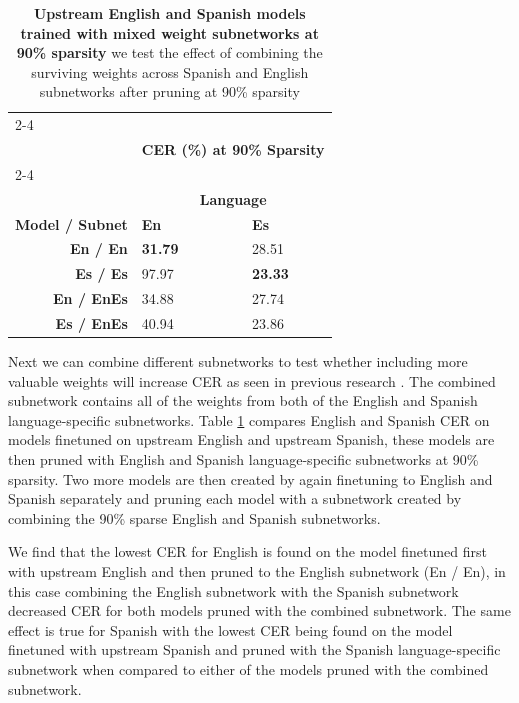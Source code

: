 \begin{table}
\centering
\begin{tabular}{llll}
\cline{2-4} \\[-1.5ex] 
 & \multicolumn{3}{c}{\textbf{CER (\%) at 90\% Sparsity }} \\ \cline{2-4}{} \\[-1.5ex]
 & \multicolumn{3}{c}{\textbf{Language}} \\[0.5ex] \hline
\multicolumn{1}{l|}{\textbf{Model / Subnet}} & \multicolumn{1}{l}{\textbf{En}} & \multicolumn{1}{l}{} & \multicolumn{1}{l}{\textbf{Es}}  \\ \hline
\multicolumn{1}{r|}{\textbf{En / En}} & \multicolumn{1}{l}{\textbf{31.79}} & \multicolumn{1}{l}{} & \multicolumn{1}{l}{28.51}   \\ %
\multicolumn{1}{r|}{\textbf{Es / Es}} & \multicolumn{1}{l}{97.97} & \multicolumn{1}{l}{} & \multicolumn{1}{l}{\textbf{23.33}}  \\ %
\multicolumn{1}{r|}{\textbf{En / EnEs}} & \multicolumn{1}{l}{34.88} & \multicolumn{1}{l}{} &\multicolumn{1}{l}{27.74} \\ %
\multicolumn{1}{r|}{\textbf{Es / EnEs}} & \multicolumn{1}{l}{40.94} & \multicolumn{1}{l}{} & \multicolumn{1}{l}{23.86}   \\ \hline 
\end{tabular}
\caption{\textbf{Upstream English and Spanish models trained with mixed weight subnetworks at 90\% sparsity} we test the effect of combining the surviving weights across Spanish and English subnetworks after pruning at 90\% sparsity}%
\label{tab:90perc_EnglishSpanish_Mixed_Mask}
\end{table}

\newpage
Next we can combine different subnetworks to test whether including more valuable weights will increase CER as seen in previous research \cite{yang2023learning}. The combined subnetwork contains all of the weights from both of the English and Spanish language-specific subnetworks. Table \ref{tab:90perc_EnglishSpanish_Mixed_Mask} compares English and Spanish CER on models finetuned on upstream English and upstream Spanish, these models are then pruned with English and Spanish language-specific subnetworks at 90\% sparsity. Two more models are then created by again finetuning to English and Spanish separately and pruning each model with a subnetwork created by combining the 90\% sparse English and Spanish subnetworks. 

We find that the lowest CER for English is found on the model finetuned first with upstream English and then pruned to the English subnetwork (En / En), in this case combining the English subnetwork with the Spanish subnetwork decreased CER for both models pruned with the combined subnetwork. The same effect is true for Spanish with the lowest CER being found on the model finetuned with upstream Spanish and pruned with the Spanish language-specific subnetwork when compared to either of the models pruned with the combined subnetwork. 

